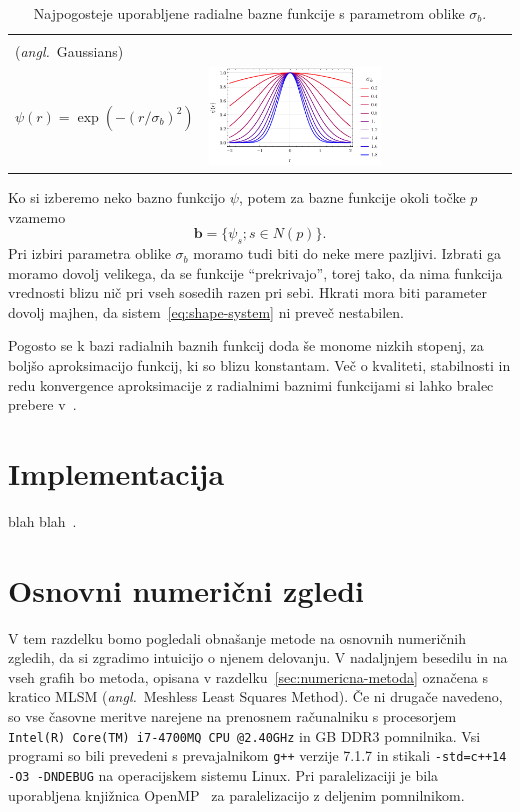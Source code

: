 \documentclass[12pt,a4paper]{article}
\theoremstyle{definition} %
\theoremstyle{plain} %
\numberwithin{equation}{section}
\renewcommand{\b}{\boldsymbol}
\newcommand{\ang}[1]{(\textit{angl.}\ #1)}
\begin{document}
\begin{table}[!h]
\begin{tabular}{|m{5.2cm}|l|}
    \tc{Gaussove funkcije (G) \\ \ang{Gaussians} \\[3ex] $\psi(r) =
    \exp(-(r/\sigma_b)^2)$} & \includegraphics[width=0.58\textwidth]{images/rbf_gau.pdf} \\ \hline
  \end{tabular}
  \caption{Najpogosteje uporabljene radialne bazne funkcije s parametrom oblike
  $\sigma_b$.}
  \label{tab:rbf}
\end{table}

Ko si izberemo neko bazno funkcijo $\psi$, potem za bazne funkcije okoli točke
$p$ vzamemo
\[
  \b b = \{\psi_s; s \in N(p) \}.
\]
Pri izbiri parametra oblike $\sigma_b$ moramo tudi biti do neke mere pazljivi. Izbrati
ga moramo dovolj velikega, da se funkcije ``prekrivajo'', torej tako, da nima
funkcija vrednosti blizu nič pri vseh sosedih razen pri sebi. Hkrati mora biti
parameter dovolj majhen, da sistem~\eqref{eq:shape-system} ni preveč nestabilen.

Pogosto se k bazi radialnih baznih funkcij doda še monome nizkih stopenj, za
boljšo aproksimacijo funkcij, ki so blizu konstantam. Več o kvaliteti,
stabilnosti in redu konvergence aproksimacije z radialnimi baznimi funkcijami
si lahko bralec prebere v~\cite{buhmann2000radial}.

\section{Implementacija}
blah blah~\cite{stroustrup1995c++}.

\section{Osnovni numerični zgledi}
V tem razdelku bomo pogledali obnašanje metode na osnovnih numeričnih zgledih,
da si zgradimo intuicijo o njenem delovanju. V nadaljnjem besedilu in na vseh grafih bo
metoda, opisana v razdelku~\ref{sec:numericna-metoda} označena s kratico MLSM
\ang{Meshless Least Squares Method}.
Če ni drugače navedeno, so vse časovne meritve narejene na
prenosnem računalniku s procesorjem
\verb|Intel(R) Core(TM) i7-4700MQ CPU @2.40GHz|
in \unit[16]{GB} DDR3 pomnilnika. Vsi programi so bili prevedeni s
prevajalnikom \verb|g++| verzije 7.1.7 in stikali
\verb|-std=c++14 -O3 -DNDEBUG| na operacijskem sistemu Linux.
Pri paralelizaciji je bila uporabljena knjižnica OpenMP~\cite{dagum1998openmp}
za paralelizacijo z deljenim pomnilnikom.
\end{document}
